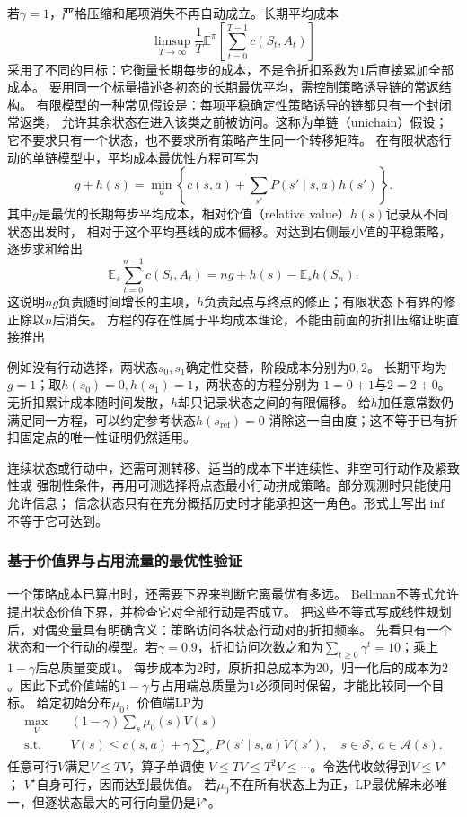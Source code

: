 若$\gamma=1$，严格压缩和尾项消失不再自动成立。长期平均成本
\[
  \limsup_{T\to\infty}\frac1T
    \mathbb E^\pi\left[\sum_{t=0}^{T-1}c(S_t,A_t)\right]
\]
采用了不同的目标：它衡量长期每步的成本，不是令折扣系数为$1$后直接累加全部成本。
要用同一个标量描述各初态的长期最优平均，需控制策略诱导链的常返结构。
有限模型的一种常见假设是：每项平稳确定性策略诱导的链都只有一个封闭常返类，
允许其余状态在进入该类之前被访问。这称为单链（unichain）假设；
它不要求只有一个状态，也不要求所有策略产生同一个转移矩阵。
在有限状态行动的单链模型中，平均成本最优性方程可写为
\[
  g+h(s)=\min_a\left\{c(s,a)+\sum_{s'}P(s'\mid s,a)h(s')\right\}.
\]
其中$g$是最优的长期每步平均成本，相对价值（relative value）$h(s)$记录从不同状态出发时，
相对于这个平均基线的成本偏移。对达到右侧最小值的平稳策略，逐步求和给出
\[
 \mathbb E_s\sum_{t=0}^{n-1}c(S_t,A_t)
 =ng+h(s)-\mathbb E_s h(S_n).
\]
这说明$ng$负责随时间增长的主项，$h$负责起点与终点的修正；有限状态下有界的修正除以$n$后消失。
方程的存在性属于平均成本理论，不能由前面的折扣压缩证明直接推出

例如没有行动选择，两状态$s_0,s_1$确定性交替，阶段成本分别为$0,2$。
长期平均为$g=1$；取$h(s_0)=0,h(s_1)=1$，两状态的方程分别为
$1=0+1$与$2=2+0$。无折扣累计成本随时间发散，$h$却只记录状态之间的有限偏移。
给$h$加任意常数仍满足同一方程，可以约定参考状态$h(s_{\mathrm{ref}})=0$
消除这一自由度；这不等于已有折扣固定点的唯一性证明仍然适用。

连续状态或行动中，还需可测转移、适当的成本下半连续性、非空可行动作及紧致性或
强制性条件，再用可测选择将点态最小行动拼成策略。部分观测时只能使用允许信息；
信念状态只有在充分概括历史时才能承担这一角色。形式上写出$\inf$不等于它可达到。

\subsubsection{基于价值界与占用流量的最优性验证}

一个策略成本已算出时，还需要下界来判断它离最优有多远。
Bellman不等式允许提出状态价值下界，并检查它对全部行动是否成立。
把这些不等式写成线性规划后，对偶变量具有明确含义：策略访问各状态行动对的折扣频率。
先看只有一个状态和一个行动的模型。若$\gamma=0.9$，折扣访问次数之和为$\sum_{t\geq0}\gamma^t=10$；乘上$1-\gamma$后总质量变成$1$。
每步成本为$2$时，原折扣总成本为$20$，归一化后的成本为$2$。因此下式价值端的$1-\gamma$与占用端总质量为$1$必须同时保留，才能比较同一个目标。
给定初始分布$\mu_0$，价值端LP为
\begin{equation}
  \begin{aligned}
    \max_V\quad &(1-\gamma)\sum_s\mu_0(s)V(s)\\
    \text{s.t.}\quad&
      V(s)\leq c(s,a)+\gamma\sum_{s'}P(s'\mid s,a)V(s'),
      \quad s\in\mathcal S,\ a\in\mathcal A(s).
  \end{aligned}
  \label{eq:decision-value-lp}
\end{equation}
任意可行$V$满足$V\leq TV$，算子单调使
$V\leq TV\leq T^2V\leq\cdots$。令迭代收敛得到$V\leq V^\star$；
$V^\star$自身可行，因而达到最优值。
若$\mu_0$不在所有状态上为正，LP最优解未必唯一，但逐状态最大的可行向量仍是$V^\star$。

